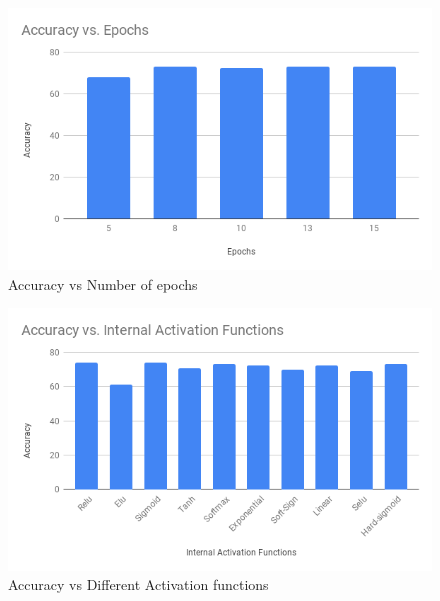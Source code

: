 \documentclass[a4paper,11pt]{article}
\begin{document}
\begin{figure}
\includegraphics[width=\linewidth]{x3.png}
\caption{Accuracy vs Number of epochs}
\end{figure}


\begin{figure}
\includegraphics[width=\linewidth]{x4.png}
\caption{Accuracy vs Different Activation functions}
\end{figure}



\newpage 
\end{document}
